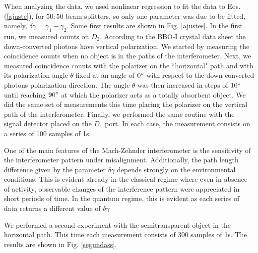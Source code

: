 \documentclass[12pt]{book}
\begin{document}
When analyzing the data, we used nonlinear regression to fit the data to Eqs. (\ref{ajuste}), for $50:50$ beam splitters, so only one parameter was due to be fitted, namely, $\delta\gamma=\gamma_{1}-\gamma_{2}$. Some first results are shown in Fig. \ref{ajustes}. In the first run, we measured counts on $D_{2}$. According to the BBO-I crystal data sheet the down-converted photons have vertical polarization. We started by measuring the coincidence counts when no object is in the paths of the interferometer. Next,  we measured coincidence counts with the polarizer on the ``horizontal" path and with its polarization angle $\theta$ fixed at an angle of $0\degree$ with respect to the down-converted photons polarization direction. The angle $\theta$ was then increased in steps of $10\degree$ until reaching $90\degree$ at which the polarizer acts as a totally absorbent object. We did the same set of measurements this time placing the polarizer on the vertical path of the interferometer. Finally, we performed the same routine with the signal detector placed on the $D_{1}$ port. In each case, the measurement consists on a series of 100 samples of 1s.


 
 

One of the main features of the Mach-Zehnder interferometer is the sensitivity of the interferometer pattern under misalignment. Additionally, the path length difference given by the parameter $\delta\gamma$ depends strongly on the environmental conditions. This is evident already in the classical regime where even in absence of activity, observable changes of the interference pattern were appreciated in short periods of time. In the quantum regime, this is evident as each series of data returns a different value of $\delta\gamma$

We performed a second experiment with the semitransparent object in the horizontal path. This time each measurement consists of 300 samples of 1s. The results are shown in Fig. \ref{segundass}.
\end{document}
